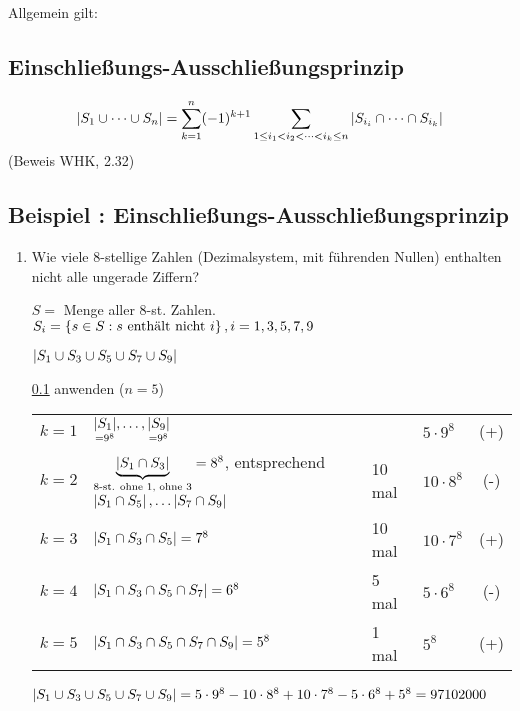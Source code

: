 Allgemein gilt:

\subsection{Einschließungs-Ausschließungsprinzip}
\label{subsec:einausschliessprinzip}

\[\abs{ S_1 \cup \dots \cup S_n} = \sum_{k=1}^n(-1)^{k+1} \sum_{1 \leq i_1 < i_2 < \dots < i_k \leq n}{\abs{S_{i_i} \cap \dots \cap S_{i_k}}} \]
(Beweis WHK, 2.32)

\subsection{Beispiel : Einschließungs-Ausschließungsprinzip}

\begin{enumerate}
	\item Wie viele 8-stellige Zahlen (Dezimalsystem, mit führenden Nullen) enthalten nicht alle ungerade Ziffern?
	
	$S =$ Menge aller 8-st. Zahlen.
	\\$S_i = \left\{s \in S : s \text{ enthält nicht } i\right\}, i = 1, 3, 5, 7, 9 $
	
	$\left|S_1 \cup S_3 \cup S_5 \cup S_7 \cup S_9\right|$
	
	\ref{subsec:einausschliessprinzip} anwenden 
	($n=5 $)
	
	\begin{tabular}{l@{ : }lllc}

	$k=1$ 
	& $\underset{=9^8}{\left|S_1\right|}, \dots, \underset{=9^8}{\left|S_9\right|}$
	&
	& $5 \cdot 9^8$ 
	& (+)\\
	
	
	$k=2$ 
	& $\underbrace{\left|S_1 \cap S_3\right|}_{\text{8-st. ohne 1, ohne 3}} = 8^8$, entsprechend $\left|S_1 \cap S_5\right|, \dots \left|S_7 \cap S_9\right|$ 
	& 10 mal 
	& $10 \cdot 8^8$ 
	&(-) \\
	
	$k=3$ 
	& $\left|S_1 \cap S_3 \cap S_5\right| = 7^8$ 
	& 10 mal 
	&$10 \cdot 7^8$ 
	&(+) \\
	
 	$k=4$
 	& $\left|S_1 \cap S_3 \cap S_5 \cap S_7\right| = 6^8$ 
 	& 5 mal 
 	& $5 \cdot 6^8$ 
 	& (-) \\
 	
 	$k=5$ 
 	& $\left|S_1 \cap S_3 \cap S_5 \cap S_7 \cap S_9\right| = 5^8$ 
 	& 1 mal 
 	& $5^8$ 
 	& (+) \\
	 \end{tabular}
 		
	
	$\left|S_1 \cup S_3 \cup S_5 \cup S_7 \cup S_9\right| = 5 \cdot 9^8 - 10 \cdot 8^8 + 10\cdot 7^8 - 5 \cdot 6^8 + 5^8 = 97102000$
\end{enumerate}
                             


















